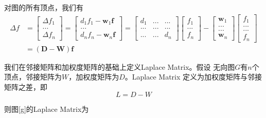 \documentclass[lang=cn,10pt]{elegantbook}
\begin{document}
对图的所有顶点，我们有
\begin{equation}
	\begin{aligned}
		\Delta f & =
		\begin{bmatrix}\Delta f_1\\...\\\Delta f_n\end{bmatrix}=\begin{bmatrix}d_1f_1-\mathbf{w}_1\mathbf{f}\\...\\d_nf_n-\mathbf{w}_n\mathbf{f}\end{bmatrix}=\begin{bmatrix}d_1&...&...\\...&...&...\\...&...&d_n\end{bmatrix}\begin{bmatrix}f_1\\...\\f_n\end{bmatrix}-\begin{bmatrix}\mathbf{w}_1\\...\\...\\\mathbf{w}_n\end{bmatrix}\begin{bmatrix}f_1\\...\\...\\f_n\end{bmatrix} \\
		         & =\left(\mathbf{D}-\mathbf{W}\right)\mathbf{f}
	\end{aligned}
\end{equation}
\par 我们在邻接矩阵和加权度矩阵的基础上定义Laplace Matrix。假设
无向图$G$有$n$个顶点，邻接矩阵为$W$，加权度矩阵为$D$。Laplace Matrix
定义为加权度矩阵与邻接矩阵之差，即
\begin{equation}
	L = D-W
\end{equation}
\par 则图\ref{g}的Laplace Matrix为
\end{document}
